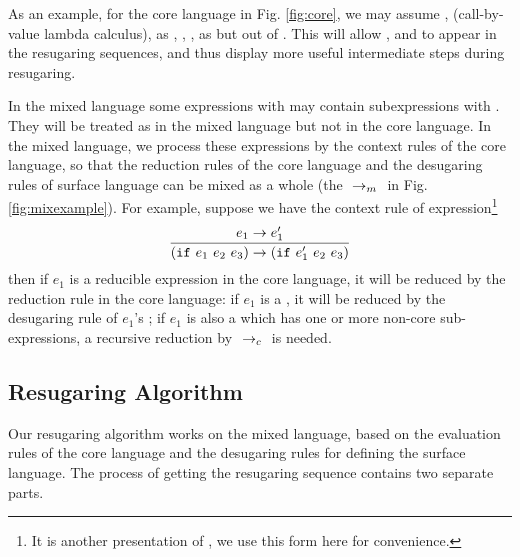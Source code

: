 


As an example, for the core language in Fig.  \ref{fig:core},
we may assume , \m{$\lambda$} (call-by-value lambda calculus),  as , , ,  as  but out of . This will allow , \m{$\lambda$} and  to appear in the resugaring sequences, and thus display more useful intermediate steps during resugaring.

In the mixed language some expressions with  may contain subexpressions with . They will be treated as  in the mixed language but not  in the core language. In the mixed language, we process these expressions by the context rules of the core language, so that the reduction rules of the core language and the desugaring rules of surface language can be mixed as a whole
 (the $~\rightarrow_m~$ in Fig. \ref{fig:mixexample}). For example, suppose we have the context rule of  expression\footnote{It is another presentation of , we use this form here for convenience.}
\[
\infer{(\m{if}~e_1~e_2~e_3) \rightarrow (\m{if}~e_1'~e_2~e_3)}{e_1 \rightarrow e_1'}
\]
then if $e_1$ is a reducible expression in the core language, it will be reduced by the reduction rule in the core language: if $e_1$ is a , it will be reduced by the desugaring rule of $e_1$'s ; if $e_1$ is also a  which has one or more non-core sub-expressions, a recursive reduction by $~\rightarrow_c~$ is needed.


\subsection{Resugaring Algorithm}

Our resugaring algorithm works on the mixed language, based on the evaluation rules of the core language and the desugaring rules for defining the surface language. The process of  getting the resugaring sequence contains two separate parts.

